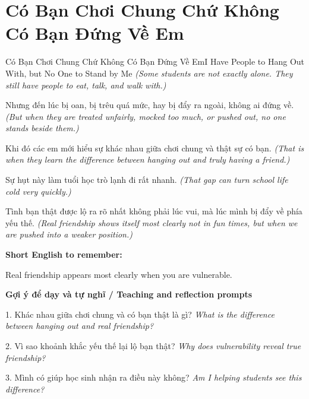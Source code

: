 \section{Có Bạn Chơi Chung Chứ Không Có Bạn Đứng Về Em}
\begin{truyen}{Có Bạn Chơi Chung Chứ Không Có Bạn Đứng Về Em}{I Have People to Hang Out With, but No One to Stand by Me}
\textit{(Some students are not exactly alone. They still have people to eat, talk, and walk with.)}

Nhưng đến lúc bị oan, bị trêu quá mức, hay bị đẩy ra ngoài, không ai đứng về.
\textit{(But when they are treated unfairly, mocked too much, or pushed out, no one stands beside them.)}

Khi đó các em mới hiểu sự khác nhau giữa chơi chung và thật sự có bạn.
\textit{(That is when they learn the difference between hanging out and truly having a friend.)}

Sự hụt này làm tuổi học trò lạnh đi rất nhanh.
\textit{(That gap can turn school life cold very quickly.)}

\end{truyen}

\begin{baihoc}
Tình bạn thật được lộ ra rõ nhất không phải lúc vui, mà lúc mình bị đẩy về phía yếu thế.
\textit{(Real friendship shows itself most clearly not in fun times, but when we are pushed into a weaker position.)}
\end{baihoc}

\begin{ghinhoanh}
\textbf{Short English to remember:}

Real friendship appears most clearly when you are vulnerable.

\end{ghinhoanh}

\begin{tuhocnhanh}
\textbf{Gợi ý để dạy và tự nghĩ / Teaching and reflection prompts}

1. Khác nhau giữa chơi chung và có bạn thật là gì? \textit{What is the difference between hanging out and real friendship?}

2. Vì sao khoảnh khắc yếu thế lại lộ bạn thật? \textit{Why does vulnerability reveal true friendship?}

3. Mình có giúp học sinh nhận ra điều này không? \textit{Am I helping students see this difference?}
\end{tuhocnhanh}
\ngancach

